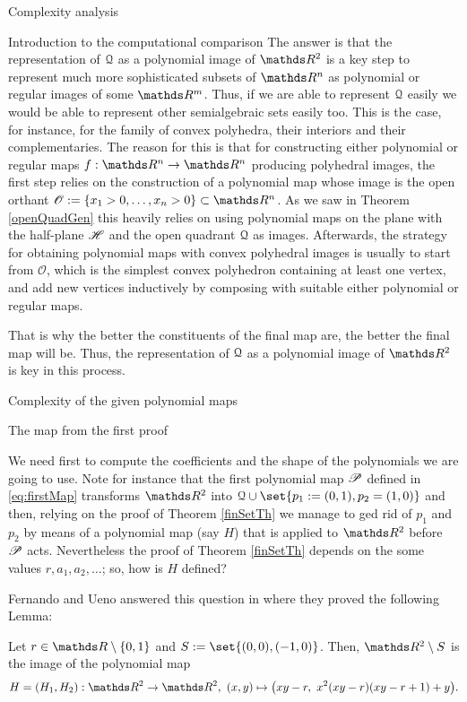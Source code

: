 \documentclass[11pt, a4paper, english, twoside, notitlepage, openright]{report}
\begin{document}
\begin{chapter}{Complexity analysis}
\begin{section}{Introduction to the computational comparison}
The answer is that the representation of $\Qu$ as a polynomial image of $\R^2$ is a key step to represent much more sophisticated subsets of $\R^n$ as polynomial or regular images of some $\R^m$. Thus, if we are able to represent $\Qu$ easily we would be able to represent other semialgebraic sets easily too. This is the case, for instance, for the family  of convex polyhedra, their interiors and their complementaries. The reason for this is that for constructing either polynomial or regular maps $f:\R^n\to\R^n$ producing polyhedral images, the first step relies on the construction of a polynomial map whose image is the open orthant $\mathscr{O}:=\{x_1>0,\dots,x_n>0\}\subset\R^n$. As we saw in Theorem \ref{openQuadGen} this heavily relies on using polynomial maps on the plane with the half-plane $\H$ and the open quadrant $\Qu$ as images. Afterwards, the strategy for obtaining polynomial maps with convex polyhedral images is usually to start from $\mathscr{O}$, which is the simplest convex polyhedron containing at least one vertex, and add new vertices inductively by composing with suitable either polynomial or regular maps.

That is why the better the constituents of the final map are, the better the final map will be.  Thus, the representation of $\Qu$ as a polynomial image of $\R^2$ is key in this process.	
\end{section}

\begin{section}{Complexity of the given polynomial maps}\label{5sect2}

\begin{subsection}{The map from the first proof}

We need first to compute the coefficients and the shape of the polynomials we are going to use. Note for instance that the first polynomial map $\P$ defined in \ref{eq:firstMap} transforms $\R^2$ into $\Qu\cup\set{p_1:=(0,1),p_2=(1,0)}$ and then, relying on the proof of Theorem \ref{finSetTh} we manage to ged rid of $p_1$ and $p_2$ by means of a polynomial map (say $H$) that is applied to $\R^2$ before $\P$ acts. Nevertheless the proof of Theorem \ref{finSetTh} depends on the some values $r,a_1,a_2,\dots$; so, how is $H$ defined?

\vspace{1mm}

Fernando and Ueno answered this question in \cite{fu1} where they proved the following Lemma:

\begin{lemma}
Let $r\in\R\setminus\{0,1\}$ and $S:=\set{(0,0),(-1,0)}$. Then, $\R^2\setminus S$ is the image of the polynomial map 
$$
H=(H_1,H_2):\R^2\to\R^2,\ (x,y)\mapsto\big(xy-r,\ x^2(xy-r)(xy-r+1)+y\big).
$$	
\end{lemma}


\end{subsection}
\end{section}
\end{chapter}
\end{document}
